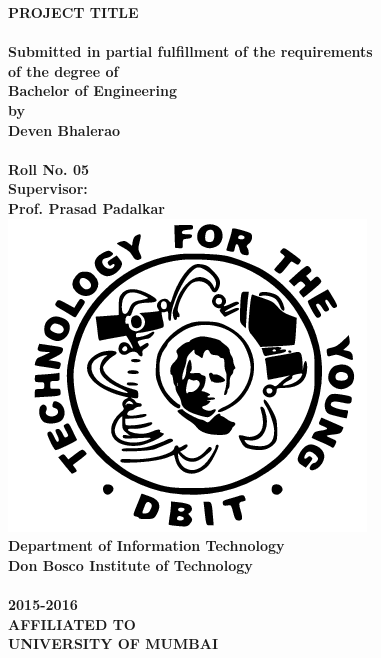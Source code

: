 \newpage
\begin{center}
\thispagestyle{empty}
\LARGE{\textbf{PROJECT TITLE}}\\[0.5cm]
\vspace{0.5cm}
\Large{\textbf{\\Submitted in partial fulfillment of the requirements}}
\vspace{0.5cm}
\Large{\textbf{\\of the degree of}}
\vspace{0.5cm}
\LARGE{\textbf{\\Bachelor of Engineering}}
\vspace{0.5cm}
\Large{\textbf{\\by}}
\vspace{0.5cm}
\Large{\textbf{\\Deven Bhalerao\\}}
\Large{\textbf{\\Roll No. 05 \\}}
\vspace{0.5cm}
\Large{\textbf{Supervisor:}}\\
\vspace{0.5cm}
\Large{\textbf{Prof. Prasad Padalkar}}\\
\vspace{1cm}
\includegraphics[scale=0.5]{project/images/jscoe_logo}\\
\vspace{1cm}
\Large{\textbf{Department of Information Technology}}\\
\vspace{0.5cm}
\Large{\textbf{Don Bosco Institute of Technology}}\\
\large{\textbf{\\2015-2016}}\\
\vspace{1cm}
\Large{\textbf{AFFILIATED TO\\}}
\vspace{0.5cm}
\LARGE{\textbf{UNIVERSITY OF MUMBAI}}
\newpage
\end{center}